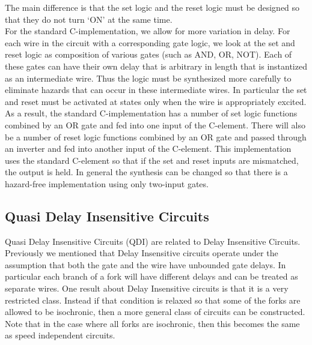 \documentclass[12pt]{report}
\begin{document}
The main difference is that the set logic and the reset logic must be designed so that they do not turn `ON' at the same time.\\

For the standard C-implementation, we allow for more variation in delay.  For each wire in the circuit with a corresponding gate logic, we look at the set and reset logic as composition of various gates (such as AND, OR, NOT).  Each of these gates can have their own delay that is arbitrary in length that is instantized as an intermediate wire.  Thus the logic must be synthesized more carefully to eliminate hazards that can occur in these intermediate wires.  In particular the set and reset must be activated at states only when the wire is appropriately excited.  As a result, the standard C-implementation has a number of set logic functions combined by an OR gate and fed into one input of the C-element.  There will also be a number of reset logic functions combined by an OR gate and passed through an inverter and fed into another input of the C-element.  This implementation uses the standard C-element so that if the set and reset inputs are mismatched, the output is held.  In general the synthesis can be changed so that there is a hazard-free implementation using only two-input gates.
 
 
 \subsection{Quasi Delay Insensitive Circuits}
Quasi Delay Insensitive Circuits (QDI) are related to Delay Insensitive Circuits.  Previously we mentioned that Delay Insensitive circuits operate under the assumption that both the gate and the wire have unbounded gate delays.  In particular each branch of a fork will have different delays and can be treated as separate wires.  One result about Delay Insensitive circuits is that it is a very restricted class.  Instead if that condition is relaxed so that some of the forks are allowed to be isochronic, then a more general class of circuits can be constructed.  Note that in the case where all forks are isochronic, then this becomes the same as speed independent circuits.  \\
 
\end{document}

